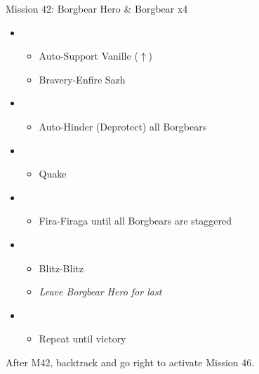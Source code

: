 \begin{battle}{Mission 42: Borgbear Hero \& Borgbear x4}
	\begin{itemize}
		\item \third
			\begin{itemize}
				\item Auto-Support Vanille ($\uparrow$)
				\item Bravery-Enfire Sazh
			\end{itemize}
		\item \fifth
			\begin{itemize}
				\item Auto-Hinder (Deprotect) all Borgbears
			\end{itemize}
		\item \first
			\begin{itemize}
				\item Quake
			\end{itemize}
		\item \sixth
			\begin{itemize}
				\item Fira-Firaga until all Borgbears are staggered
			\end{itemize}
		\item \first
			\begin{itemize}
				\item Blitz-Blitz
				\item \textit{Leave Borgbear Hero for last}
			\end{itemize}
		\item \second
			\begin{itemize}
				\item Repeat until victory
			\end{itemize}																			
	\end{itemize}
\end{battle}

After M42, backtrack and go right to activate Mission 46.

